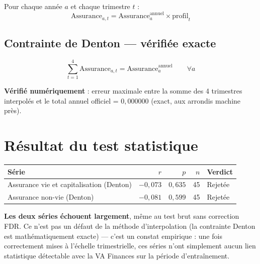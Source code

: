 \documentclass[11pt,a4paper]{article}
\begin{document}
Pour chaque année $a$ et chaque trimestre $t$ :
\begin{equation}
\text{Assurance}_{a,t} = \text{Assurance}_a^{\text{annuel}} \times \text{profil}_t
\end{equation}

\subsection{Contrainte de Denton --- vérifiée exacte}

\begin{equation}
\sum_{t=1}^{4} \text{Assurance}_{a,t} = \text{Assurance}_a^{\text{annuel}} \qquad \forall a
\end{equation}

\begin{fichebox}
\textbf{Vérifié numériquement} : erreur maximale entre la somme des 4 trimestres interpolés et le total annuel officiel = $0{,}000000$ (exact, aux arrondis machine près).
\end{fichebox}

\section{Résultat du test statistique}

\begin{alertebox}
\begin{center}
\begin{tabular}{lrrrl}
\toprule
\textbf{Série} & $r$ & $p$ & $n$ & \textbf{Verdict} \\
\midrule
Assurance vie et capitalisation (Denton) & $-0{,}073$ & $0{,}635$ & 45 & Rejetée \\
Assurance non-vie (Denton) & $-0{,}081$ & $0{,}599$ & 45 & Rejetée \\
\bottomrule
\end{tabular}
\end{center}

\textbf{Les deux séries échouent largement}, même au test brut sans correction FDR. Ce n'est pas un défaut de la méthode d'interpolation (la contrainte Denton est mathématiquement exacte) --- c'est un constat empirique : une fois correctement mises à l'échelle trimestrielle, ces séries n'ont simplement aucun lien statistique détectable avec la VA Finances sur la période d'entraînement.
\end{alertebox}
\end{document}
